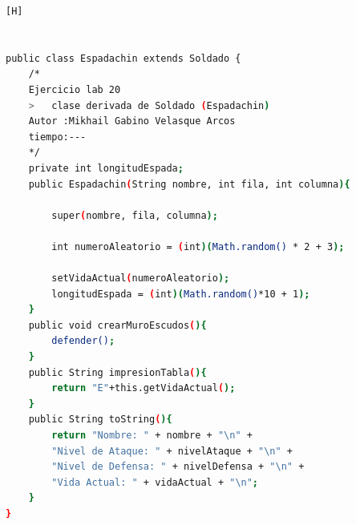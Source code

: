 \documentclass{article}
\begin{document}
	\begin{lstlisting}[language=bash,caption={CLASE Espadachin}][H]
	

public class Espadachin extends Soldado {
	/*
	Ejercicio lab 20 
	>	clase derivada de Soldado (Espadachin) 
	Autor :Mikhail Gabino Velasque Arcos
	tiempo:---
	*/
    private int longitudEspada;
    public Espadachin(String nombre, int fila, int columna){

        super(nombre, fila, columna);

        int numeroAleatorio = (int)(Math.random() * 2 + 3);

		setVidaActual(numeroAleatorio);
        longitudEspada = (int)(Math.random()*10 + 1);
    }
    public void crearMuroEscudos(){
        defender();
    }
    public String impresionTabla(){
        return "E"+this.getVidaActual();
    }
    public String toString(){
        return "Nombre: " + nombre + "\n" +
        "Nivel de Ataque: " + nivelAtaque + "\n" +
        "Nivel de Defensa: " + nivelDefensa + "\n" +
        "Vida Actual: " + vidaActual + "\n";
    }
}
	\end{lstlisting}	
	
\end{document}
